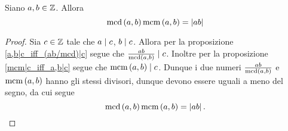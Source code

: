 \begin{proposition}
    \label{mcm*mcd=ab}
    Siano $a, b \in \mathbb{Z}$. Allora
    \begin{equation}
        \operatorname{mcd}\left(a, b\right)\operatorname{mcm}\left(a, b\right) = \left|ab\right|
    \end{equation}
\end{proposition}
\begin{proof}
    Sia $c \in \mathbb{Z}$ tale che $a \mid c$, $b \mid c$. Allora per la proposizione \ref{a,b|c_iff_(ab/mcd)|c} segue che $\frac{ab}{\operatorname{mcd}\left(a, b\right)} \mid c$. Inoltre per la proposizione \ref{mcm|c_iff_a,b|c} segue che $\operatorname{mcm}\left(a, b\right) \mid c$.
    Dunque i due numeri $\frac{ab}{\operatorname{mcd}\left(a, b\right)}$ e $\operatorname{mcm}\left(a, b\right)$ hanno gli stessi divisori, dunque devono essere uguali a meno del segno, da cui segue \[
        \operatorname{mcd}\left(a, b\right)\operatorname{mcm}\left(a, b\right) = \left|ab\right|. 
    \]
\end{proof}